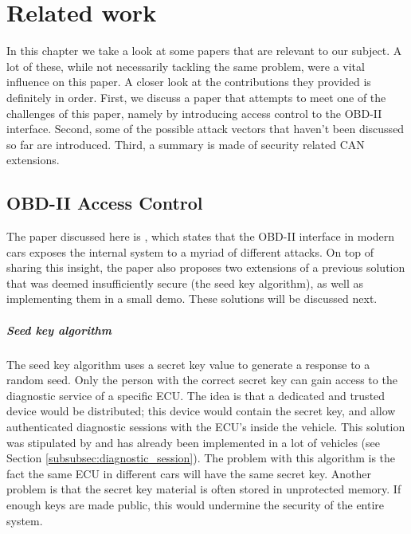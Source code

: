 \chapter{Related work}
\label{chap:related_work}

In this chapter we take a look at some papers that are relevant to our subject. A lot of these, while not necessarily tackling the same problem, were a vital influence on this paper. A closer look at the contributions they provided is definitely in order. First, we discuss a paper that attempts to meet one of the challenges of this paper, namely by introducing access control to the OBD-II interface. Second, some of the possible attack vectors that haven't been discussed so far are introduced. Third, a summary is made of security related CAN extensions.

\section{OBD-II Access Control}
\label{sec:obd_access_control}

The paper discussed here is \cite{Yadav16}, which states that the OBD-II interface in modern cars exposes the internal system to a myriad of different attacks. On top of sharing this insight, the paper also proposes two extensions of a previous solution that was deemed insufficiently secure (the seed key algorithm), as well as implementing them in a small demo. These solutions will be discussed next.


\paragraph{Seed key algorithm} The seed key algorithm uses a secret key value to generate a response to a random seed. Only the person with the correct secret key can gain access to the diagnostic service of a specific ECU. The idea is that a dedicated and trusted device would be distributed; this device would contain the secret key, and allow authenticated diagnostic sessions with the ECU's inside the vehicle. This solution was stipulated by \cite{Bayer} and has already been implemented in a lot of vehicles (see Section \ref{subsubsec:diagnostic_session}). The problem with this algorithm is the fact the same ECU in different cars will have the same secret key. Another problem is that the secret key material is often stored in unprotected memory. If enough keys are made public, this would undermine the security of the entire system.  

